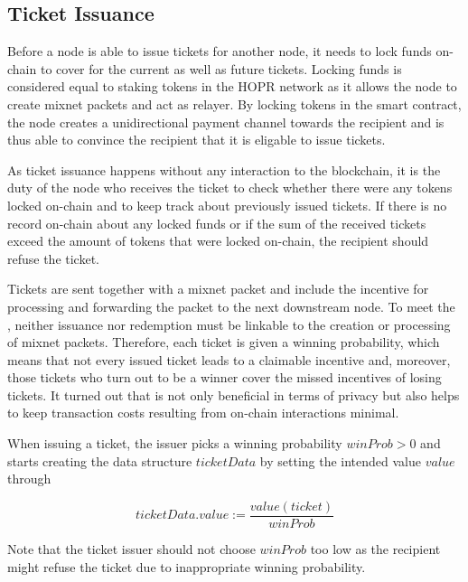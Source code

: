 \subsection{Ticket Issuance}
\label{sec:tickets:issuance}

Before a node is able to issue tickets for another node, it needs to lock funds on-chain to cover for the current as well as future tickets. Locking funds is considered equal to staking tokens in the HOPR network as it allows the node to create mixnet packets and act as relayer. By locking tokens in the smart contract, the node creates a unidirectional payment channel towards the recipient and is thus able to convince the recipient that it is eligable to issue tickets.

As ticket issuance happens without any interaction to the blockchain, it is the duty of the node who receives the ticket to check whether there were any tokens locked on-chain and to keep track about previously issued tickets. If there is no record on-chain about any locked funds or if the sum of the received tickets exceed the amount of tokens that were locked on-chain, the recipient should refuse the ticket.

Tickets are sent together with a mixnet packet and include the incentive for processing and forwarding the packet to the next downstream node. To meet the , neither issuance nor redemption must be linkable to the creation or processing of mixnet packets. Therefore, each ticket is given a winning probability, which means that not every issued ticket leads to a claimable incentive and, moreover, those tickets who turn out to be a winner cover the missed incentives of losing tickets. It turned out that is not only beneficial in terms of privacy but also helps to keep transaction costs resulting from on-chain interactions minimal.

When issuing a ticket, the issuer picks a winning probability $winProb > 0$ and starts creating the data structure $ticketData$ by setting the intended value $value$ through

$$ ticketData.value := \frac{value(ticket)}{winProb} $$

Note that the ticket issuer should not choose $winProb$ too low as the recipient might refuse the ticket due to inappropriate winning probability.

